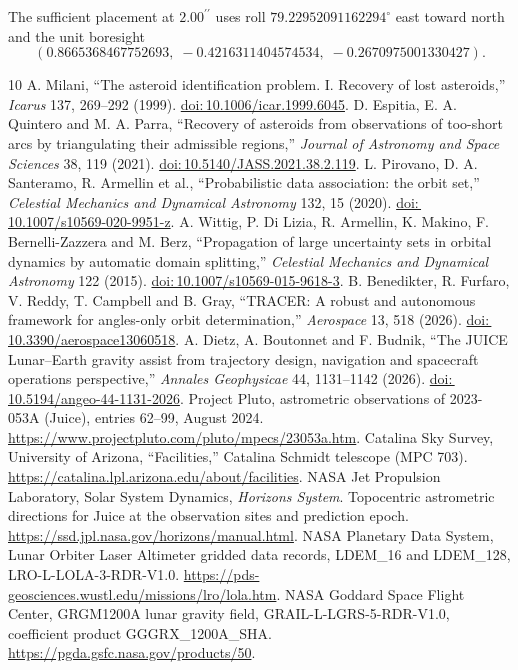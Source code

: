 \documentclass[10pt,letterpaper]{article}
\newcommand{\degc}{^{\circ}}
\newcommand{\as}{^{\prime\prime}}
\newcommand{\doi}[1]{\href{https://doi.org/#1}{doi:\,#1}}
\begin{document}
The sufficient placement at $2.00\as$ uses roll $79.22952091162294\degc$ east toward north and the unit boresight
\[ (0.8665368467752693,\;-0.4216311404574534,\;-0.2670975001330427). \]
\begin{thebibliography}{10}
 A. Milani, ``The asteroid identification problem. I. Recovery of lost asteroids,'' \emph{Icarus} 137, 269--292 (1999). \doi{10.1006/icar.1999.6045}.
 D. Espitia, E. A. Quintero and M. A. Parra, ``Recovery of asteroids from observations of too-short arcs by triangulating their admissible regions,'' \emph{Journal of Astronomy and Space Sciences} 38, 119 (2021). \doi{10.5140/JASS.2021.38.2.119}.
 L. Pirovano, D. A. Santeramo, R. Armellin et al., ``Probabilistic data association: the orbit set,'' \emph{Celestial Mechanics and Dynamical Astronomy} 132, 15 (2020). \doi{10.1007/s10569-020-9951-z}.
 A. Wittig, P. Di Lizia, R. Armellin, K. Makino, F. Bernelli-Zazzera and M. Berz, ``Propagation of large uncertainty sets in orbital dynamics by automatic domain splitting,'' \emph{Celestial Mechanics and Dynamical Astronomy} 122 (2015). \doi{10.1007/s10569-015-9618-3}.
 B. Benedikter, R. Furfaro, V. Reddy, T. Campbell and B. Gray, ``TRACER: A robust and autonomous framework for angles-only orbit determination,'' \emph{Aerospace} 13, 518 (2026). \doi{10.3390/aerospace13060518}.
 A. Dietz, A. Boutonnet and F. Budnik, ``The JUICE Lunar--Earth gravity assist from trajectory design, navigation and spacecraft operations perspective,'' \emph{Annales Geophysicae} 44, 1131--1142 (2026). \doi{10.5194/angeo-44-1131-2026}.
 Project Pluto, astrometric observations of 2023-053A (Juice), entries 62--99, August 2024. \url{https://www.projectpluto.com/pluto/mpecs/23053a.htm}.
 Catalina Sky Survey, University of Arizona, ``Facilities,'' Catalina Schmidt telescope (MPC 703). \url{https://catalina.lpl.arizona.edu/about/facilities}.
 NASA Jet Propulsion Laboratory, Solar System Dynamics, \emph{Horizons System}. Topocentric astrometric directions for Juice at the observation sites and prediction epoch. \url{https://ssd.jpl.nasa.gov/horizons/manual.html}.
 NASA Planetary Data System, Lunar Orbiter Laser Altimeter gridded data records, LDEM\_16 and LDEM\_128, LRO-L-LOLA-3-RDR-V1.0. \url{https://pds-geosciences.wustl.edu/missions/lro/lola.htm}.
 NASA Goddard Space Flight Center, GRGM1200A lunar gravity field, GRAIL-L-LGRS-5-RDR-V1.0, coefficient product GGGRX\_1200A\_SHA. \url{https://pgda.gsfc.nasa.gov/products/50}.
\end{thebibliography}
\end{document}
